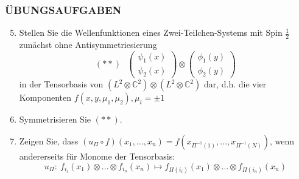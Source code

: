 \documentclass[twoside,a4paper]{scrartcl}
\newcommand{\C}{\mathbb{C}}
\renewcommand{\1}{\mathds{1}}
\renewcommand{\C}{\mathbb{C}}
\begin{document}
\subsubsection*{ÜBUNGSAUFGABEN}
\begin{enumerate}
\setcounter{enumi}{4}
\item Stellen Sie die Wellenfunktionen eines Zwei-Teilchen-Systems mit Spin $\frac{1}{2}$ zunächst ohne Antisymmetriesierung 
$$(**) \ \  \ \begin{pmatrix} \psi_1(x) \\ \psi_2(x)\end{pmatrix} \otimes \begin{pmatrix} \phi_1(y) \\ \phi_2(y)\end{pmatrix}$$
in der Tensorbasis von $(L^2\otimes \C^2)\otimes(L^2\otimes \C^2)$ dar, d.h. die vier Komponenten $f(x,y,\mu_1, \mu_2), \mu_i=\pm 1$
\item Symmetrisieren Sie $(**)$.
\item Zeigen Sie, dass $(u_\Pi\circ f)(x_1, ...,x_n)=f(x_{\Pi^{-1}(1)},...,x_{\Pi^{-1}(N)})$, wenn andererseits für Monome der Tensorbasis:
$$u_\Pi: \ f_{i_i}(x_1)\otimes... \otimes f_{i_n}(x_n) \mapsto f_{\Pi(i_i)}(x_1)\otimes... \otimes f_{\Pi(i_n)}(x_n)$$
\end{enumerate}
\end{document}
